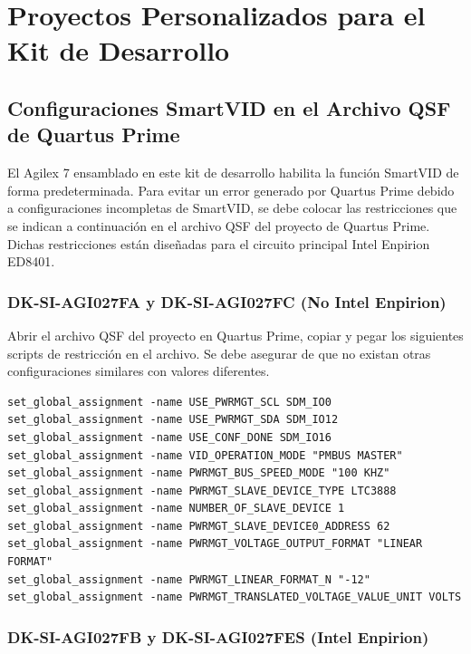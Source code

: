 \section{Proyectos Personalizados para el Kit de Desarrollo}

\subsection{Configuraciones SmartVID en el Archivo QSF de Quartus Prime}

    El Agilex 7 ensamblado en este kit de desarrollo habilita la funci\'on SmartVID de forma predeterminada. Para evitar un error generado por Quartus Prime debido a configuraciones incompletas de SmartVID, se debe colocar las restricciones que se indican a continuaci\'on en el archivo QSF del proyecto de Quartus Prime. Dichas restricciones est\'an dise\~nadas para el circuito principal Intel Enpirion ED8401.

\subsubsection{DK-SI-AGI027FA y DK-SI-AGI027FC (No Intel Enpirion)}

    Abrir el archivo QSF del proyecto en Quartus Prime, copiar y pegar los siguientes scripts de restricci\'on en el archivo. Se debe asegurar de que no existan otras configuraciones similares con valores diferentes.

    \begin{lstlisting}
set_global_assignment -name USE_PWRMGT_SCL SDM_IO0
set_global_assignment -name USE_PWRMGT_SDA SDM_IO12
set_global_assignment -name USE_CONF_DONE SDM_IO16
set_global_assignment -name VID_OPERATION_MODE "PMBUS MASTER"
set_global_assignment -name PWRMGT_BUS_SPEED_MODE "100 KHZ"
set_global_assignment -name PWRMGT_SLAVE_DEVICE_TYPE LTC3888
set_global_assignment -name NUMBER_OF_SLAVE_DEVICE 1
set_global_assignment -name PWRMGT_SLAVE_DEVICE0_ADDRESS 62
set_global_assignment -name PWRMGT_VOLTAGE_OUTPUT_FORMAT "LINEAR FORMAT"
set_global_assignment -name PWRMGT_LINEAR_FORMAT_N "-12"
set_global_assignment -name PWRMGT_TRANSLATED_VOLTAGE_VALUE_UNIT VOLTS
    \end{lstlisting}

\subsubsection{DK-SI-AGI027FB y DK-SI-AGI027FES (Intel Enpirion)}

